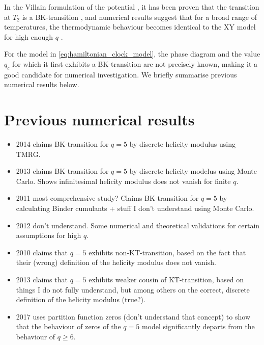 In the Villain formulation of the potential \cite{villain1975theory}, it has been proven that the transition at $T_2$ is
a BK-transition \cite{jose1977renormalization}, and numerical results suggest that for a broad range of temperatures,
the thermodynamic behaviour becomes identical to the XY model for high enough $q$ \cite{lapilli2006universality}.

For the model in \autoref{eq:hamiltonian_clock_model}, the phase diagram and the value $q_c$ for which it first exhibits
a BK-transition are not precisely known, making it a good candidate for numerical investigation. We briefly summarise
previous numerical results below.

\section{Previous numerical results}

\begin{itemize}
  \item \cite{chatelain2014dmrg} 2014 claims BK-transition for $q = 5$ by discrete helicity modulus using TMRG.
  \item \cite{kumano2013response} 2013 claims BK-transition for $q = 5$ by discrete helicity modelus using Monte Carlo.
  Shows infinitesimal helicity modulus does not vanish for finite $q$.
  \item \cite{borisenko2011numerical} 2011 most comprehensive study? Claims BK-transition for $q = 5$ by calculating
  Binder cumulants + stuff I don't understand using Monte Carlo.
  \item \cite{borisenko2012phase} 2012 don't understand. Some numerical and theoretical validations for certain
  assumptions for high $q$.
  \item \cite{baek2010non} 2010 claims that $q = 5$ exhibits non-KT-transition, based on the fact that their (wrong)
  definition of the helicity modulus does not vanish.
  \item \cite{baek2013residual} 2013 claims that $q = 5$ exhibits weaker cousin of KT-transition, based on things I do
  not fully understand, but among others on the correct, discrete definition of the helicity modulus (true?).
  \item \cite{kim2017partition} 2017 uses partition function zeros (don't understand that concept) to show that the
  behaviour of zeros of the $q = 5$ model significantly departs from the behaviour of $q \geq 6$.
\end{itemize}

